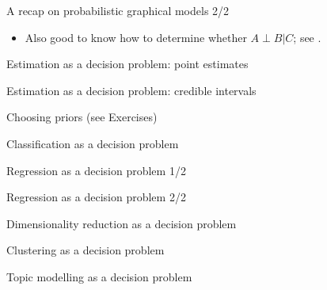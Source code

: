 \documentclass[10pt]{beamer}
\begin{document}
\begin{frame}{A recap on probabilistic graphical models 2/2}
  \begin{itemize}
    \item Also good to know how to determine whether $A\perp B\vert C$; see \citep[Section 10.5]{Mur12}.
    \blank
  \end{itemize}
  \blank
\end{frame}


\begin{frame}{Estimation as a decision problem: point estimates}
\end{frame}

\begin{frame}{Estimation as a decision problem: credible intervals}
\end{frame}

\begin{frame}{Choosing priors (see Exercises)}
\end{frame}

\begin{frame}{Classification as a decision problem}
\end{frame}

\begin{frame}{Regression as a decision problem 1/2}
\end{frame}

\begin{frame}{Regression as a decision problem 2/2}
\end{frame}

\begin{frame}{Dimensionality reduction as a decision problem}
\end{frame}

\begin{frame}{Clustering as a decision problem}
\end{frame}

\begin{frame}{Topic modelling as a decision problem}
\end{frame}

\end{document}
